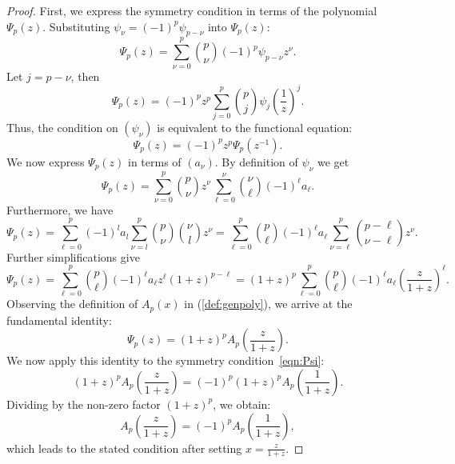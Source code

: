 \documentclass[10pt,reqno,a4paper]{amsart}%
\theoremstyle{definition}
\begin{document}
\begin{proof}
First, we express the symmetry condition in terms of the polynomial $\Psi
_{p}(z)$. Substituting $\psi_{\nu}=(-1)^{p}\psi_{p-\nu}$ into $\Psi_{p}(z)$:
\[
\Psi_{p}(z)=\sum_{\nu=0}^{p}\binom{p}{\nu}(-1)^{p}\psi_{p-\nu}z^{\nu}.
\]
Let $j=p-\nu$, then
\[
\Psi_{p}(z)=(-1)^{p}z^{p}\sum_{j=0}^{p}\binom{p}{j}\psi_{j}\left(  \frac{1}%
{z}\right)  ^{j}.
\]
Thus, the condition on $(\psi_{\nu})$ is equivalent to the functional
equation:
\begin{equation}
\Psi_{p}(z)=(-1)^{p}z^{p}\Psi_{p}(z^{-1}). \label{eqn:Psi}%
\end{equation}
We now express $\Psi_{p}(z)$ in terms of $(a_{\nu})$. By definition of
$\psi_{\nu}$ we get
\[
\Psi_{p}(z)=\sum_{\nu=0}^{p}\binom{p}{\nu}z^{\nu}\sum_{\ell=0}^{\nu}\binom
{\nu}{\ell}(-1)^{\ell}a_{\ell}.
\]
Furthermore, we have
\[
\Psi_{p}(z)=\sum_{\ell=0}^{p}(-1)^{l}a_{l}\sum_{\nu=l}^{p}\binom{p}{\nu}%
\binom{\nu}{l}z^{\nu}=\sum_{\ell=0}^{p}\binom{p}{\ell}(-1)^{\ell}a_{\ell}%
\sum_{\nu=\ell}^{p}\binom{p-\ell}{\nu-\ell}z^{\nu}.
\]
Further simplifications give
\[
\Psi_{p}(z)=\sum_{\ell=0}^{p}\binom{p}{\ell}(-1)^{\ell}a_{\ell}z^{\ell
}(1+z)^{p-\ell}=(1+z)^{p}\sum_{\ell=0}^{p}\binom{p}{\ell}(-1)^{\ell}a_{\ell
}\left(  \frac{z}{1+z}\right)  ^{\ell}.
\]
Observing the definition of $A_{p}(x)$ in (\ref{def:genpoly}), we arrive at
the fundamental identity:
\begin{equation}
\Psi_{p}(z)=(1+z)^{p}A_{p}\!\left(  \frac{z}{1+z}\right)  .
\end{equation}
We now apply this identity to the symmetry condition~\eqref{eqn:Psi}:
\[
(1+z)^{p}A_{p}\left(  \frac{z}{1+z}\right)  =(-1)^{p}(1+z)^{p}A_{p}\!\left(
\frac{1}{1+z}\right)  .
\]
Dividing by the non-zero factor $(1+z)^{p}$, we obtain:
\[
A_{p}\!\left(  \frac{z}{1+z}\right)  =(-1)^{p}A_{p}\!\left(  \frac{1}%
{1+z}\right)  ,
\]
which leads to the stated condition after setting $x=\frac{z}{1+z}$.
\end{proof}

\end{document}
